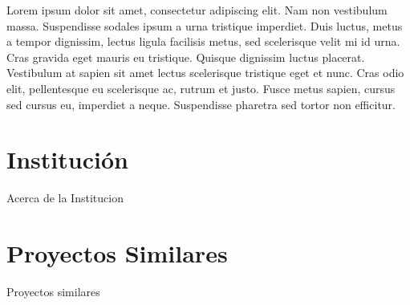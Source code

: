 Lorem ipsum dolor sit amet, consectetur adipiscing elit. Nam non vestibulum massa. Suspendisse sodales ipsum a urna tristique imperdiet. Duis luctus, metus a tempor dignissim, lectus ligula facilisis metus, sed scelerisque velit mi id urna. Cras gravida eget mauris eu tristique. Quisque dignissim luctus placerat. Vestibulum at sapien sit amet lectus scelerisque tristique eget et nunc. Cras odio elit, pellentesque eu scelerisque ac, rutrum et justo. Fusce metus sapien, cursus sed cursus eu, imperdiet a neque. Suspendisse pharetra sed tortor non efficitur.
\section{Institución}
Acerca de la Institucion
\section{Proyectos Similares}
Proyectos similares